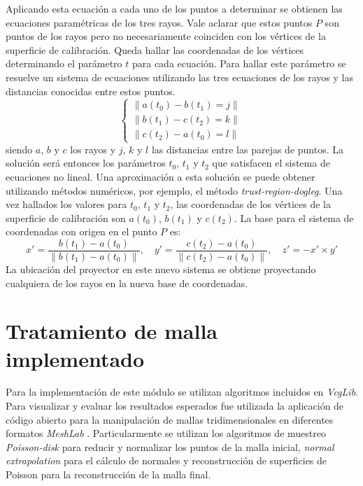 Aplicando esta ecuación a cada uno de los puntos a determinar se obtienen las ecuaciones paramétricas de los tres rayos. Vale aclarar que estos puntos $P$ son puntos de los rayos pero no necesariamente coinciden con los vértices de la superficie de calibración. Queda hallar las coordenadas de los vértices determinando el parámetro $t$ para cada ecuación. Para hallar este parámetro se resuelve un sistema de ecuaciones utilizando las tres ecuaciones de los rayos y las distancias conocidas entre estos puntos.
\[
\begin{cases}
\lVert{a(t_0) - b(t_1)} = j\rVert \\
\lVert{b(t_1) - c(t_2)} = k\rVert \\
\lVert{c(t_2) - a(t_0)} = l\rVert
\end{cases}
\]
siendo $a$, $b$ y $c$ los rayos y $j$, $k$ y $l$ las distancias entre las parejas de puntos.
La solución será entonces los parámetros $t_0$, $t_1$ y $t_2$ que satisfacen el sistema de ecuaciones no lineal.
Una aproximación a esta solución se puede obtener utilizando métodos numéricos, por ejemplo, el método \emph{trust-region-dogleg}\cite{TrustRegionDogleg}.
Una vez hallados los valores para $t_0$, $t_1$ y $t_2$, las coordenadas de los vértices de la superficie de calibración son $a(t_0)$, $b(t_1)$ y $c(t_2)$.
La base para el sistema de coordenadas con origen en el punto $P$ es:
\[
x' = \frac{b(t_1) - a(t_0)}{\lVert b(t_1) - a(t_0) \rVert},\quad y' = \frac{c(t_2) - a(t_0)}{\lVert c(t_2) - a(t_0)\rVert},\quad z' = -x' \times y'
\]
La ubicación del proyector en este nuevo sistema se obtiene proyectando cualquiera de los rayos en la nueva base de coordenadas.

\section{Tratamiento de malla implementado}

Para la implementación de este módulo se utilizan algoritmos incluidos en \emph{VcgLib}. Para visualizar y evaluar los resultados esperados fue utilizada la aplicación de código abierto para la manipulación de mallas tridimensionales en diferentes formatos \emph{MeshLab} \cite{MeshLab}. Particularmente se utilizan los algoritmos de muestreo \emph{Poisson-disk} para reducir y normalizar los puntos de la malla inicial, \emph{normal extrapolation} para el cálculo de normales y reconstrucción de superficies de Poisson para la reconstrucción de la malla final.

